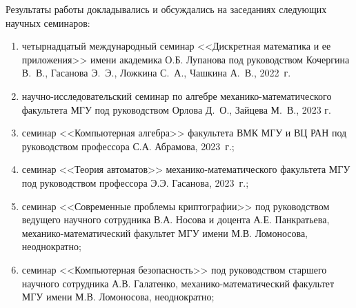 Результаты работы докладывались и обсуждались на заседаниях следующих научных семинаров:
\begin{enumerate}
    \item четырнадцатый международный семинар <<Дискретная математика и ее приложения>> имени академика О.Б. Лупанова под руководством Кочергина В.~В., Гасанова Э.~Э., Ложкина С.~А., Чашкина А.~В., 2022~г.

    \item научно-исследовательский семинар по алгебре механико-математического факультета МГУ под руководством Орлова Д.~О., Зайцева М.~В., 2023 г.

    \item семинар <<Компьютерная алгебра>> факультета ВМК МГУ и ВЦ РАН под руководством профессора С.А. Абрамова, 2023~г.;

    \item семинар <<Теория автоматов>> механико-математического факультета МГУ под руководством профессора Э.Э. Гасанова, 2023~г.;

    \item семинар <<Современные проблемы криптографии>> под руководством ведущего научного сотрудника В.А. Носова и доцента А.Е. Панкратьева, механико-математический факультет МГУ имени М.В. Ломоносова, неоднократно;

    \item семинар <<Компьютерная безопасность>> под руководством старшего научного сотрудника А.В. Галатенко, механико-математический факультет МГУ имени М.В. Ломоносова, неоднократно;
\end{enumerate}


